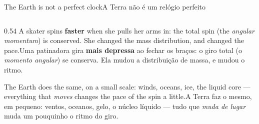 \documentclass[aspectratio=169,11pt]{beamer}
\newcommand{\tr}[2]{\ifEN#2\else#1\fi}
\newcommand{\bnum}[1]{\textbf{\textcolor{mTeal}{#1}}}
\begin{document}
\begin{frame}{\tr{A Terra não é um relógio perfeito}{The Earth is not a perfect clock}}
  \begin{columns}[T]
    \begin{column}{0.54\textwidth}
      \small
      \tr{Uma patinadora gira \bnum{mais depressa} ao fechar os braços: o giro total (o \emph{momento angular}) se conserva. Ela mudou a distribuição de massa, e mudou o ritmo.}{A skater spins \bnum{faster} when she pulls her arms in: the total spin (the \emph{angular momentum}) is conserved. She changed the mass distribution, and changed the pace.}
      \medskip

      \tr{A Terra faz o mesmo, em pequeno: ventos, oceanos, gelo, o núcleo líquido --- tudo que \emph{muda de lugar} muda um pouquinho o ritmo do giro.}{The Earth does the same, on a small scale: winds, oceans, ice, the liquid core --- everything that \emph{moves} changes the pace of the spin a little.}
      \medskip


\end{column}
\end{columns}
\end{frame}
\end{document}
